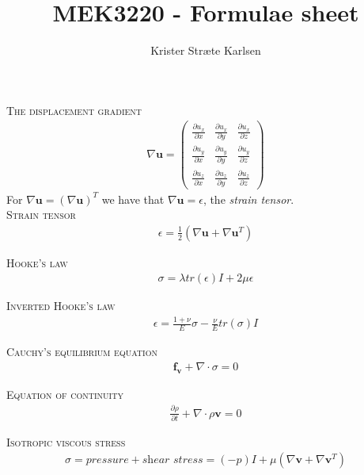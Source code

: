 \documentclass[11pt,a4paper,english]{article}
\title{MEK3220 - Formulae sheet}
\author{Krister Stræte Karlsen}
\begin{document}
\maketitle

{\scshape The displacement gradient} 
\begin{align*}
\nabla \mathbf{u} = 
\begin{pmatrix}	    \frac{\partial u_x}{ \partial x} & \frac{\partial u_x}{ \partial y} & \frac{\partial u_x}{ \partial z}      \\
                		\frac{\partial u_y}{ \partial x} & \frac{\partial u_y}{ \partial y} & \frac{\partial u_y}{ \partial z}     \\
               	 	\frac{\partial u_z}{ \partial x} & \frac{\partial u_z}{ \partial y} &\frac{\partial u_z}{ \partial z}     
\end{pmatrix}
\end{align*}
\hspace{1cm} For $ \nabla \mathbf{u} =  ( \nabla \mathbf{u})^T  $ we have that $\nabla \mathbf{u} = \epsilon $, the \emph{strain tensor}.\\

{\scshape Strain tensor} 
\begin{align*}
\epsilon = \frac{1}{2}(\nabla \mathbf{u} + \nabla \mathbf{u}^T  ) 
\end{align*}

{\scshape Hooke's law} 
\begin{align*}
\sigma  = \lambda tr(\epsilon) I + 2\mu \epsilon 
\end{align*}

{\scshape Inverted Hooke's law} 
\begin{align*}
\epsilon = \frac{1+\nu}{E}\sigma - \frac{\nu}{E} tr(\sigma)I
\end{align*}

{\scshape Cauchy's equilibrium equation} 
\begin{align*}
\mathbf{f_v} + \nabla \cdot \sigma = 0
\end{align*}

{\scshape Equation of continuity} 
\begin{align*}
\frac{\partial \rho}{\partial t} + \nabla \cdot  \rho \mathbf{v} = 0
\end{align*}

{\scshape Isotropic viscous stress} 
\begin{align*}
\sigma = pressure + \textit{shear stress} =  (-p)I + \mu (\nabla \mathbf{v}  + \nabla \mathbf{v}^T  )
\end{align*}
\end{document}
